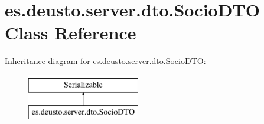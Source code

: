 \hypertarget{classes_1_1deusto_1_1server_1_1dto_1_1_socio_d_t_o}{}\section{es.\+deusto.\+server.\+dto.\+Socio\+D\+TO Class Reference}
\label{classes_1_1deusto_1_1server_1_1dto_1_1_socio_d_t_o}
Inheritance diagram for es.\+deusto.\+server.\+dto.\+Socio\+D\+TO\+:\begin{figure}[H]
\begin{center}
\leavevmode
\includegraphics[height=2.000000cm]{classes_1_1deusto_1_1server_1_1dto_1_1_socio_d_t_o}
\end{center}
\end{figure}
